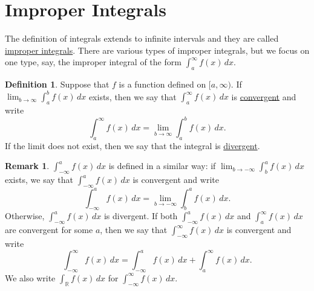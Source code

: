 \documentclass[12pt,letterpaper]{book}
\numberwithin{equation}{section}
\theoremstyle{definition}
\newtheorem{defi}[thm]{\textbf{Definition}}
\newtheorem{remark}[thm]{\textbf{Remark}}
\begin{document}
\section{Improper Integrals}
The definition of integrals extends to infinite intervals and they are called \underline{improper integrals}.
There are various types of improper integrals, but we focus on one type, say, the improper integral of the form $\displaystyle{\int_a^\infty f(x)\,dx}$.

\begin{defi} Suppose that $f$ is a function defined on $[a,\infty)$. If $\displaystyle{\lim_{b\to \infty}\int_a^b f(x)\,dx}$ exists, then we say that $\displaystyle{\int_a^\infty f(x)\,dx}$ is \underline{convergent} and write
$$\int_a^\infty f(x)\,dx=\lim_{b\to \infty}\int_a^b f(x)\,dx.$$
If the limit does not exist, then we say that the integral is \underline{divergent}.
\end{defi}

\begin{remark}
$\displaystyle{\int_{-\infty}^a f(x)\,dx}$ is defined in a similar way: if $\displaystyle{\lim_{b\to -\infty} \int_{b}^a f(x)\,dx}$ exists, we say that $\displaystyle{\int_{-\infty}^a f(x)\,dx}$ is convergent and write
$$\int_{-\infty}^a f(x)\,dx=\lim_{b\to -\infty} \int_{b}^a f(x)\,dx.$$ Otherwise, $\displaystyle{\int_{-\infty}^a f(x)\,dx}$ is divergent. If both $\displaystyle{\int_{-\infty}^a f(x)\,dx}$ and $\displaystyle{\int_a^\infty f(x)\,dx}$ are convergent for some $a$, then we say that $\displaystyle{\int_{-\infty}^\infty f(x)\,dx}$ is convergent and write
$$\int_{-\infty}^\infty f(x)\,dx=\int_{-\infty}^a f(x)\,dx+\int_a^\infty f(x)\,dx.$$
We also write $\displaystyle{\int_\mathbb{R}f(x)\,dx}$ for $\displaystyle{\int_{-\infty}^\infty f(x)\,dx}$.
\end{remark}
\end{document}
